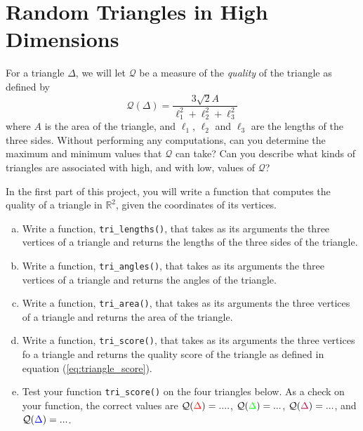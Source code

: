 \section{Random Triangles in High Dimensions}

For a triangle $\Delta$, we will let $\mathcal{Q}$ be a measure of the \textit{quality} of the triangle as defined by
\begin{equation}
\label{eq:triangle_score}
\mathcal{Q}(\Delta) = \frac{3\sqrt{2} A}{ \ell_1^2 + \ell_2^2 + \ell_3^2}
\end{equation}
where $A$ is the area of the triangle, and $\ell_1$, $\ell_2$ and $\ell_3$ are the lengths of the three sides.
Without performing any computations, can you determine the maximum and minimum values that $\mathcal{Q}$ can take? Can you describe what kinds of triangles are associated with high, and with low, values of $\mathcal{Q}$?

In the first part of this project, you will write a function that computes the quality of a triangle in $\mathbb{R}^2$, given the coordinates of its vertices.

\begin{enumerate}[(a)]
  \item Write a function, \texttt{tri\_lengths()}, that takes as its arguments the three vertices of a triangle and returns the lengths of the three sides of the triangle.  
  \item Write a function, \texttt{tri\_angles()}, that takes as its arguments the three vertices of a triangle and returns the angles of the triangle.
  \item Write a function, \texttt{tri\_area()}, that takes as its arguments the three vertices of a triangle and returns the area of the triangle.
  \item Write a function, \texttt{tri\_score()}, that takes as its arguments the three vertices fo a triangle and returns the quality score of the triangle as defined in equation (\ref{eq:triangle_score}). 
  \item Test your function \texttt{tri\_score()} on the four triangles below. As a check on your function, the correct values are $\mathcal{Q}({\color{red}{\Delta}}) = ....$, $\mathcal{Q}({\color{green}{\Delta}}) = ...$, $\mathcal{Q}({ \color{purple}{\Delta}}) = ...$, and $\mathcal{Q}({ \color{blue}{\Delta}}) = ...$.
\end{enumerate}

\begin{center}
\end{center}

